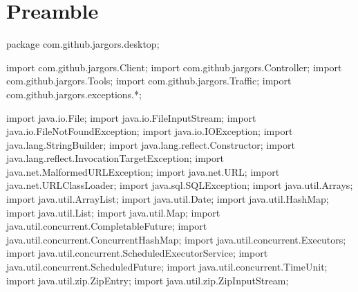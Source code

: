 \section{Preamble}
\nwenddocs{}\endmoddef{}
package com.github.jargors.desktop;
\nwendcode{}\nwdocspar

\nwenddocs{}\plusendmoddef
import com.github.jargors.Client;
import com.github.jargors.Controller;
import com.github.jargors.Tools;
import com.github.jargors.Traffic;
import com.github.jargors.exceptions.*;
\nwendcode{}\nwdocspar

\nwenddocs{}\plusendmoddef
import java.io.File;
import java.io.FileInputStream;
import java.io.FileNotFoundException;
import java.io.IOException;
import java.lang.StringBuilder;
import java.lang.reflect.Constructor;
import java.lang.reflect.InvocationTargetException;
import java.net.MalformedURLException;
import java.net.URL;
import java.net.URLClassLoader;
import java.sql.SQLException;
import java.util.Arrays;
import java.util.ArrayList;
import java.util.Date;
import java.util.HashMap;
import java.util.List;
import java.util.Map;
import java.util.concurrent.CompletableFuture;
import java.util.concurrent.ConcurrentHashMap;
import java.util.concurrent.Executors;
import java.util.concurrent.ScheduledExecutorService;
import java.util.concurrent.ScheduledFuture;
import java.util.concurrent.TimeUnit;
import java.util.zip.ZipEntry;
import java.util.zip.ZipInputStream;
\nwendcode{}\nwdocspar

